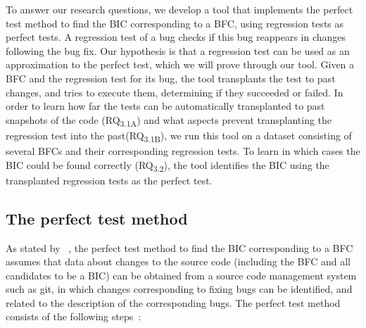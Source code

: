 To answer our research questions, we develop a tool that implements the perfect test method to find the BIC corresponding to a BFC, using regression tests as perfect tests. 
A regression test of a bug checks if this bug reappears in changes following the bug fix. 
Our hypothesis is that a regression test can be used as an approximation to the perfect test, which we will prove through our tool.
Given a BFC and the regression test for its bug,
the tool transplants the test to past changes, and tries to execute them, determining if they succeeded or failed. 
In order to learn how far the tests can be automatically transplanted to past snapshots of the code (RQ\textsubscript{3.1A}) and what aspects prevent transplanting the regression test into the past(RQ\textsubscript{3.1B}), we run this tool on a dataset consisting of several BFCs and their corresponding regression tests. 
To learn in which cases the BIC could be found correctly (RQ\textsubscript{3.2}), the tool identifies the BIC using the transplanted regression tests as the perfect test. 

\subsection{The perfect test method}
\label{subsec:model}

As stated by \gema~\cite{rodriguez2020bugs}, the perfect test method to find the BIC corresponding to a BFC assumes that data about changes to the source code (including the BFC and all candidates to be a BIC) can be obtained from a source code management system such as git, in which changes corresponding to fixing bugs can be identified, and related to the description of the corresponding bugs. 
The perfect test method consists of the following steps~\cite{rodriguez2020bugs}:

